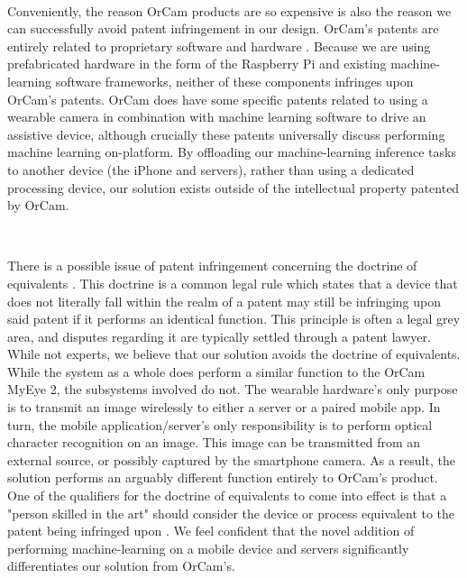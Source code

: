 \documentclass[a4paper,11pt]{article}
\begin{document}
\

\noindent
Conveniently, the reason OrCam products are so expensive is also the reason we can successfully avoid patent infringement in our design. OrCam's patents are entirely related to proprietary software \cite{orcam-software} and hardware \cite{orcam-hardware}. Because we are using prefabricated hardware in the form of the Raspberry Pi and existing machine-learning software frameworks, neither of these components infringes upon OrCam's patents. OrCam does have some specific patents related to using a wearable camera in combination with machine learning software to drive an assistive device, although crucially these patents universally discuss performing machine learning on-platform. By offloading our machine-learning inference tasks to another device (the iPhone and servers), rather than using a dedicated processing device, our solution exists outside of the intellectual property patented by OrCam.

\

\noindent
There is a possible issue of patent infringement concerning the doctrine of equivalents \cite{doctrine-of-equivalents}. This doctrine is a common legal rule which states that a device that does not literally fall within the realm of a patent may still be infringing upon said patent if it performs an identical function. This principle is often a legal grey area, and disputes regarding it are typically settled through a patent lawyer. While not experts, we believe that our solution avoids the doctrine of equivalents. While the system as a whole does perform a similar function to the OrCam MyEye 2, the subsystems involved do not. The wearable hardware's only purpose is to transmit an image wirelessly to either a server or a paired mobile app. In turn, the mobile application/server's only responsibility is to perform optical character recognition on an image. This image can be transmitted from an external source, or possibly captured by the smartphone camera. As a result, the solution performs an arguably different function entirely to OrCam's product. One of the qualifiers for the doctrine of equivalents to come into effect is that a "person skilled in the art" should consider the device or process equivalent to the patent being infringed upon \cite{doctrine-of-equivalents}. We feel confident that the novel addition of performing machine-learning on a mobile device and servers significantly differentiates our solution from OrCam's.

\newpage
\end{document}
